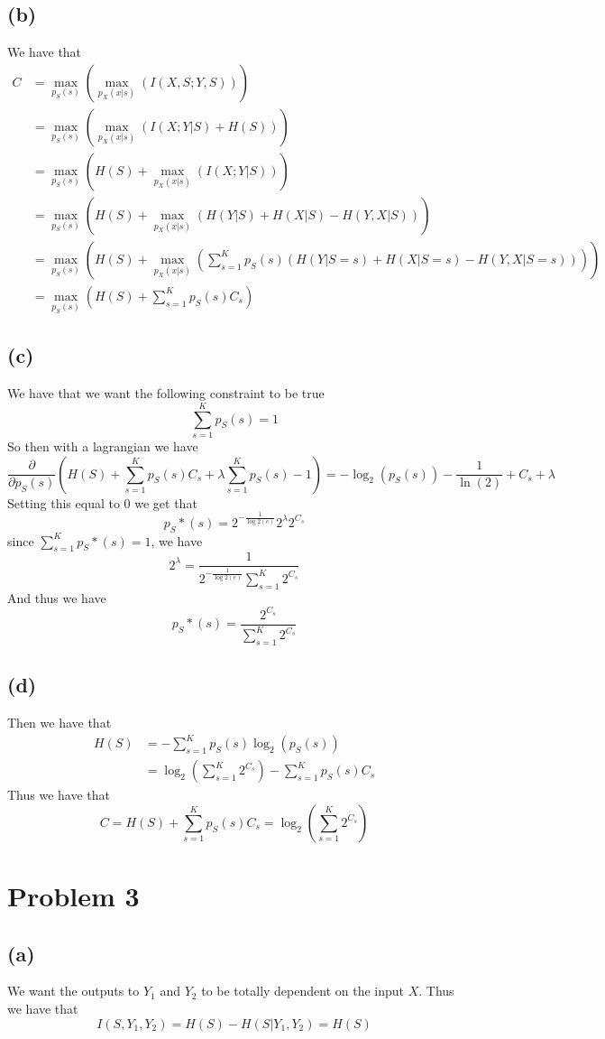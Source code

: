 \subsection*{(b)}
We have that 
\begin{align*}
    C&=\max_{p_S(s)}\left(\max_{p_X(x|s)}\left(I(X,S;Y,S)\right)\right)\\
    &=\max_{p_S(s)}\left(\max_{p_X(x|s)}\left(I(X;Y|S)+H(S)\right)\right)\\
    &=\max_{p_S(s)}\left(H(S)+\max_{p_X(x|s)}\left(I(X;Y|S)\right)\right)\\
    &=\max_{p_S(s)}\left(H(S)+\max_{p_X(x|s)}\left(H(Y|S)+H(X|S)-H(Y,X|S)\right)\right)\\
    &=\max_{p_S(s)}\left(H(S)+\max_{p_X(x|s)}\left(\sum_{s=1}^{K}p_S(s)(H(Y|S=s)+H(X|S=s)-H(Y,X|S=s))\right)\right)\\
    &=\max_{p_S(s)}\left(H(S)+\sum_{s=1}^{K}p_S(s)C_s\right)
\end{align*}
\subsection*{(c)}
We have that we want the following constraint to be true
$$\sum_{s=1}^{K}p_S(s)=1$$
So then with a lagrangian we have
$$\frac{\partial}{\partial p_S(s)}\left(H(S)+\sum_{s=1}^{K}p_S(s)C_s+\lambda\sum_{s=1}^{K}p_S(s)-1\right)=-\log_2(p_S(s))-\frac{1}{\ln(2)}+C_s+\lambda$$
Setting this equal to 0 we get that 
$$p_S*(s)=2^{-\frac{1}{\log2(e)}}2^{\lambda}2^{C_s}$$
since $\sum_{s=1}^{K}p_S*(s)=1$, we have
$$2^{\lambda}=\frac{1}{2^{-\frac{1}{\log2(e)}}\sum_{s=1}^{K}2^{C_s}}$$
And thus we have 
$$p_S*(s)=\boxed{\frac{2^{C_s}}{\sum_{s=1}^{K}2^{C_s}}}$$
\subsection*{(d)}
Then we have that 
\begin{align*}
    H(S)&=-\sum_{s=1}^{K}p_S(s)\log_2(p_S(s))\\
    &=\log_2\left(\sum_{s=1}^{K}2^{C_s}\right)-\sum_{s=1}^{K}p_S(s) C_s
\end{align*}
Thus we have that
$$C=H(S)+\sum_{s=1}^{K}p_S(s) C_s=\log_2\left(\sum_{s=1}^{K}2^{C_s}\right)$$
\section*{Problem 3}
\subsection*{(a)}
We want the outputs to $Y_1$ and $Y_2$ to be totally
dependent on the input $X$. Thus we have that 
$$I(S,Y_1,Y_2)=H(S)-H(S|Y_1,Y_2)=H(S)$$
